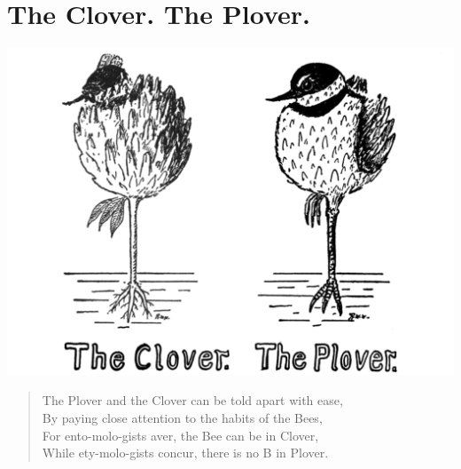 \documentclass[letterpaper, 10pt, openany]{memoir}
\begin{document}
\chapter{The Clover. The Plover.}
\includegraphics[width=1\textwidth]{f-p02.png}
\vspace{\onelineskip}
\begin{verse}\huge
The Plover and the Clover can be told apart with ease,\\
By paying close attention to the habits of the Bees,\\
For ento-molo-gists aver, the Bee can be in Clover,\\
While ety-molo-gists concur, there is no B in Plover.\\
\end{verse}
\vspace{\onelineskip}
\end{document}
